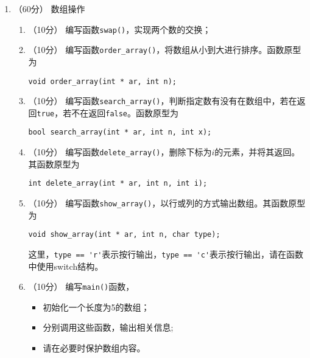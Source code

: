 \documentclass[8pt]{article}
\begin{document}
\begin{CJK}{UTF8}{gkai}
\begin{enumerate}
\item （60分） 数组操作
\begin{enumerate}
\item （10分） 编写函数\lstinline|swap()|，实现两个数的交换；
\item （10分） 编写函数\lstinline|order_array()|，将数组从小到大进行排序。函数原型为
\begin{lstlisting}
void order_array(int * ar, int n);
\end{lstlisting}
\item（10分） 编写函数\lstinline|search_array()|，判断指定数有没有在数组中，若在返回\lstinline|true|，若不在返回\lstinline|false|。函数原型为
\begin{lstlisting}
bool search_array(int * ar, int n, int x);
\end{lstlisting}
\item （10分） 编写函数\lstinline|delete_array()|，删除下标为$i$的元素，并将其返回。其函数原型为
\begin{lstlisting}
int delete_array(int * ar, int n, int i);
\end{lstlisting}
\item （10分） 编写函数\lstinline|show_array()|，以行或列的方式输出数组。其函数原型为
\begin{lstlisting}
void show_array(int * ar, int n, char type);
\end{lstlisting}
这里，\lstinline|type == 'r'|表示按行输出，\lstinline|type == 'c'|表示按行输出，请在函数中使用switch结构。
\item （10分） 编写\lstinline|main()|函数，
\begin{itemize}
	\item 初始化一个长度为5的数组；
	\item 分别调用这些函数，输出相关信息;
	\item 请在必要时保护数组内容。
\end{itemize}
\end{enumerate}


\end{enumerate}



\end{CJK}
\end{document}

